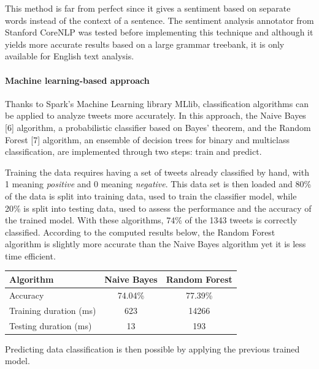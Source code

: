 \documentclass[11pt]{article}
\begin{document}
\vspace{9pt}
This method is far from perfect since it gives a sentiment based on separate words instead of the context of a sentence. The sentiment analysis annotator from \textsf{Stanford CoreNLP} was tested before implementing this technique and although it yields more accurate results based on a large grammar treebank, it is only available for English text analysis.

\paragraph{Machine learning-based approach}

Thanks to \textsf{Spark}'s Machine Learning library \textsf{MLlib}, classification algorithms can be applied to analyze tweets more accurately. In this approach, the Naive Bayes [6] algorithm, a probabilistic classifier based on Bayes' theorem, and the Random Forest [7] algorithm, an ensemble of decision trees for binary and multiclass classification, are implemented through two steps: train and predict.

\vspace{9pt}
Training the data requires having a set of tweets already classified by hand, with 1 meaning \textit{positive} and 0 meaning \textit{negative}. This data set is then loaded and 80\% of the data is split into training data, used to train the classifier model, while 20\% is split into testing data, used to assess the performance and the accuracy of the trained model.
With these algorithms, 74\% of the 1343 tweets is correctly classified. According to the computed results below, the Random Forest algorithm is slightly more accurate than the Naive Bayes algorithm yet it is less time efficient. %

\begin{center}
\begin{tabular}{|l|c|c|}
  \hline
  Algorithm & Naive Bayes & Random Forest \\
  \hline
  Accuracy & 74.04\% & 77.39\% \\ \hline
  Training duration (ms) & 623 & 14266 \\ \hline
  Testing duration (ms) & 13 & 193 \\
  \hline
\end{tabular}
\end{center}

Predicting data classification is then possible by applying the previous trained model.
\end{document}
